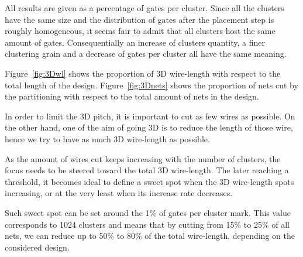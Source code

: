 \documentclass[conference]{IEEEtran}
\begin{document}
All results are given as a percentage of gates per cluster.
Since all the clusters have the same size and the distribution of gates after the placement step is roughly homogeneous, it seems fair to admit that all clusters host the same amount of gates.
Consequentially an increase of clusters quantity, a finer clustering grain and a decrease of gates per cluster all have the same meaning.

Figure~\ref{fig:3Dwl} shows the proportion of 3D wire-length with respect to the total length of the design.
Figure~\ref{fig:3Dnets} shows the proportion of nets cut by the partitioning with respect to the total amount of nets in the design.

In order to limit the 3D pitch, it is important to cut as few wires as possible.
On the other hand, one of the aim of going 3D is to reduce the length of those wire, hence we try to have as much 3D wire-length as possible.

As the amount of wires cut keeps increasing with the number of clusters, the focus needs to be steered toward the total 3D wire-length.
The later reaching a threshold, it becomes ideal to define a sweet spot when the 3D wire-length spots increasing, or at the very least when its increase rate decreases.

Such sweet spot can be set around the 1\% of gates per cluster mark.
This value corresponds to 1024 clusters and means that by cutting from 15\% to 25\% of all nets, we can reduce up to 50\% to 80\% of the total wire-length, depending on the considered design.


\end{document}
